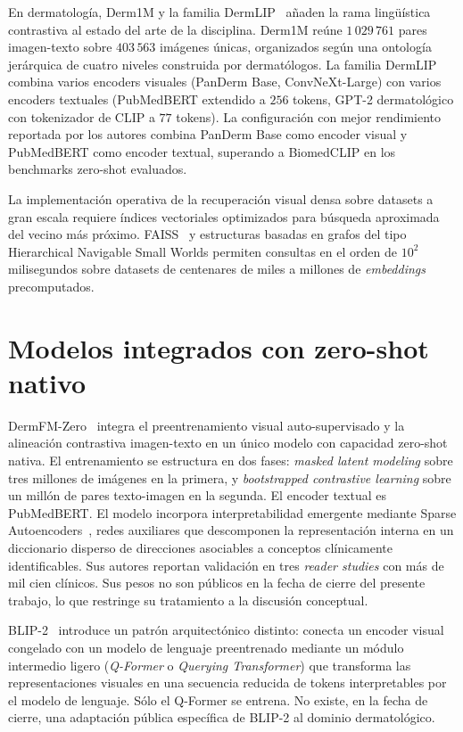 En dermatología, Derm1M y la familia DermLIP~\cite{derm1m} añaden la
rama lingüística contrastiva al estado del arte de la disciplina.
Derm1M reúne $1\,029\,761$ pares imagen-texto sobre
$403\,563$ imágenes únicas, organizados según una ontología
jerárquica de cuatro niveles construida por dermatólogos. La familia
DermLIP combina varios encoders visuales (PanDerm Base,
ConvNeXt-Large) con varios encoders textuales (PubMedBERT extendido
a $256$ tokens, GPT-2 dermatológico con tokenizador de CLIP a
$77$ tokens). La configuración con mejor rendimiento reportada
por los autores combina PanDerm Base como encoder visual y
PubMedBERT como encoder textual, superando a BiomedCLIP en los
benchmarks zero-shot evaluados.

La implementación operativa de la recuperación visual densa sobre
datasets a gran escala requiere índices vectoriales optimizados para
búsqueda aproximada del vecino más próximo. FAISS~\cite{faiss2019}
y estructuras basadas en grafos del tipo Hierarchical Navigable
Small Worlds permiten consultas en el orden de $10^2$
milisegundos sobre datasets de centenares de miles a millones de
\emph{embeddings} precomputados.

\section{Modelos integrados con zero-shot nativo}
\label{sec:zero-shot-nativo}

DermFM-Zero~\cite{dermfmzero2026} integra el preentrenamiento visual
auto-supervisado y la alineación contrastiva imagen-texto en un
único modelo con capacidad zero-shot nativa. El entrenamiento se
estructura en dos fases: \emph{masked latent modeling} sobre tres
millones de imágenes en la primera, y \emph{bootstrapped contrastive
learning} sobre un millón de pares texto-imagen en la segunda. El
encoder textual es PubMedBERT. El modelo incorpora interpretabilidad
emergente mediante Sparse Autoencoders~\cite{templeton2024}, redes
auxiliares que descomponen la representación interna en un
diccionario disperso de direcciones asociables a conceptos
clínicamente identificables. Sus autores reportan validación en
tres \emph{reader studies} con más de mil cien clínicos. Sus pesos
no son públicos en la fecha de cierre del presente trabajo, lo que
restringe su tratamiento a la discusión conceptual.

BLIP-2~\cite{blip2_2023} introduce un patrón arquitectónico
distinto: conecta un encoder visual congelado con un modelo de
lenguaje preentrenado mediante un módulo intermedio ligero
(\emph{Q-Former} o \emph{Querying Transformer}) que transforma las
representaciones visuales en una secuencia reducida de tokens
interpretables por el modelo de lenguaje. Sólo el Q-Former se
entrena. No existe, en la fecha de cierre, una adaptación pública
específica de BLIP-2 al dominio dermatológico.

